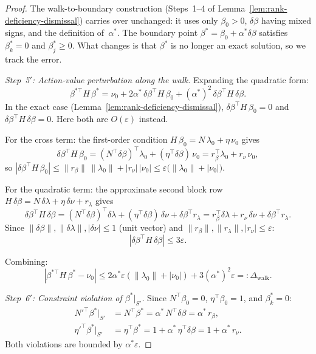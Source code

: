 \begin{proof}
The walk-to-boundary construction (Steps~1--4 of
Lemma~\ref{lem:rank-deficiency-dismissal}) carries over
unchanged: it uses only $\beta_0 > 0$, $\delta\beta$ having
mixed signs, and the definition of~$\alpha^*$.
The boundary point $\beta^* = \beta_0 + \alpha^*\delta\beta$
satisfies $\beta^*_k = 0$ and $\beta^*_j \geq 0$.
What changes is that $\beta^*$ is no longer an exact solution,
so we track the error.

\emph{Step~5${}'$: Action-value perturbation along the walk.}
Expanding the quadratic form:
\[
  \beta^{*\top} H\,\beta^*
  = \nu_0
    + 2\alpha^*\,\delta\beta^\top H\,\beta_0
    + (\alpha^*)^2\,\delta\beta^\top H\,\delta\beta.
\]
In the exact case
(Lemma~\ref{lem:rank-deficiency-dismissal}),
$\delta\beta^\top H\,\beta_0 = 0$ and
$\delta\beta^\top H\,\delta\beta = 0$.
Here both are $O(\varepsilon)$ instead.

For the cross term: the first-order condition
$H\,\beta_0 = N\,\lambda_0 + \eta\,\nu_0$ gives
\[
  \delta\beta^\top H\,\beta_0
  = (N^\top\delta\beta)^\top \lambda_0
    + (\eta^\top\delta\beta)\,\nu_0
  = r_\beta^\top \lambda_0 + r_\nu\,\nu_0,
\]
so
$|\delta\beta^\top H\,\beta_0|
  \leq \|r_\beta\|\,\|\lambda_0\| + |r_\nu|\,|\nu_0|
  \leq \varepsilon\bigl(\|\lambda_0\| + |\nu_0|\bigr)$.

For the quadratic term: the approximate second block row
$H\,\delta\beta = N\,\delta\lambda + \eta\,\delta\nu + r_\lambda$
gives
\[
  \delta\beta^\top H\,\delta\beta
  = (N^\top\delta\beta)^\top \delta\lambda
    + (\eta^\top\delta\beta)\,\delta\nu
    + \delta\beta^\top r_\lambda
  = r_\beta^\top \delta\lambda + r_\nu\,\delta\nu
    + \delta\beta^\top r_\lambda.
\]
Since $\|\delta\beta\|, \|\delta\lambda\|, |\delta\nu| \leq 1$
(unit vector) and
$\|r_\beta\|, \|r_\lambda\|, |r_\nu| \leq \varepsilon$:
\[
  |\delta\beta^\top H\,\delta\beta| \leq 3\varepsilon.
\]

Combining:
\[
  |\beta^{*\top}H\,\beta^* - \nu_0|
  \leq 2\alpha^*\varepsilon(\|\lambda_0\|+|\nu_0|)
     + 3(\alpha^*)^2\varepsilon
  =: \Delta_{\mathrm{walk}}.
\]

\emph{Step~6${}'$: Constraint violation of $\beta^*|_{S'}$.}
Since $N^\top\beta_0 = 0$, $\eta^\top\beta_0 = 1$,
and $\beta^*_k = 0$:
\begin{align*}
  {N'}^\top \beta^*|_{S'}
  &= N^\top\beta^*
   = \alpha^*\,N^\top\delta\beta
   = \alpha^*\,r_\beta, \\
  {\eta'}^\top \beta^*|_{S'}
  &= \eta^\top\beta^*
   = 1 + \alpha^*\,\eta^\top\delta\beta
   = 1 + \alpha^*\,r_\nu.
\end{align*}
Both violations are bounded by $\alpha^*\varepsilon$.


\end{proof}

